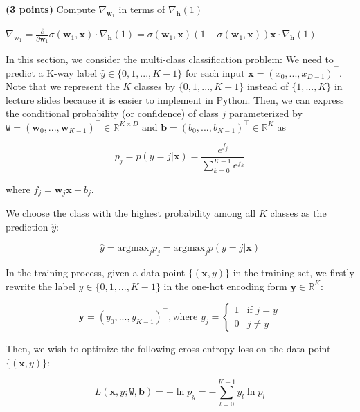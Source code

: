 \documentclass{article}
\newcommand{\R}{\mathbb{R}}
\newcommand{\x}{\mathbf{x}}
\newcommand{\w}{\mathbf{w}}
\newcommand{\h}{\mathbf{h}}
\newcommand{\W}{\texttt{W}}
\renewcommand{\b}{\mathbf{b}}
\newcommand{\y}{\mathbf{y}}
\begin{document}
\begin{probset}
\begin{prob}
\begin{subprobset}
        \begin{subprob}
            \textbf{(3 points)} Compute $\nabla_{\w_1}$ in terms of $\nabla_{\h} (1)$

            \begin{soln}
                $\nabla_{\w_1} = \frac{\partial}{\partial \w_1} \sigma(\w_1, \x) \cdot \nabla_{\h} (1) = \sigma(\w_1, \x) (1 - \sigma(\w_1, \x)) \x \cdot \nabla_{\h} (1)$
            \end{soln}
        \end{subprob}
    \end{subprobset}
\end{prob}

\newpage

\begin{prob}
    In this section, we consider the multi-class classification problem: We need to predict a K-way label $\hat{y} \in \{0, 1, ..., K - 1\}$ for each input $\x = (x_0, ..., x_{D-1})^\top$. Note that we represent the $K$ classes by $\{0, 1, ..., K - 1\}$ instead of $\{1, ..., K\}$ in lecture slides because it is easier to implement in Python. Then, we can express the conditional probability (or confidence) of class $j$ parameterized by $\W = (\w_0, ..., \w_{K-1})^\top \in \R^{K \times D}$ and $\b = (b_0, ..., b_{K-1})^\top \in \R^{K}$ as

    \[ p_j = p(y = j|\x) = \frac{e^{f_j}}{\sum_{k=0}^{K-1} e^{f_k}} \]

    where $f_j = \w_j \x + b_j$.

    We choose the class with the highest probability among all $K$ classes as the prediction $\hat{y}$:

    \[ \hat{y} = \text{argmax}_j p_j = \text{argmax}_j p(y = j|\x) \]

    In the training process, given a data point $\{(\x, y)\}$ in the training set, we firstly rewrite the label $y \in \{0, 1, ..., K - 1\}$ in the one-hot encoding form $\y \in \R^K$:

    \[ \y = (y_0, ..., y_{K-1})^\top, \text{where } y_j = \begin{cases} 1 & \text{if } j = y \\ 0 & j \neq y \end{cases} \]

    Then, we wish to optimize the following cross-entropy loss on the data point $\{(\x, y)\}$:

    \[ L(\x, y; \W, \b) = -\ln p_y = -\sum_{l=0}^{K-1} y_l \ln p_l \]


\end{prob}
\end{probset}
\end{document}
